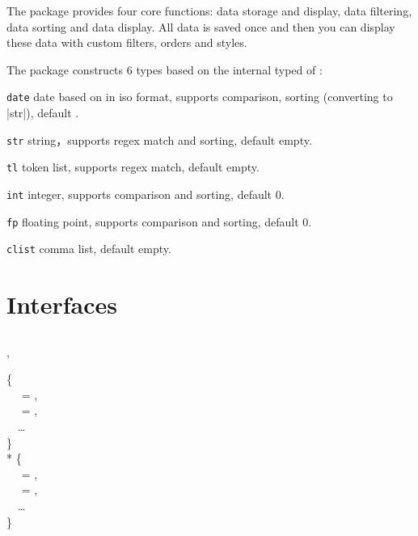 \documentclass[full]{l3doc}
\begin{document}
\begin{documentation}
The package provides four core functions: data storage and display, data
filtering, data sorting and data display. All data is saved once and then you
can display these data with custom filters, orders and styles.

The package constructs 6 types based on the internal typed of :
\begin{Description}
  \item[\texttt{date}]
    date based on  in iso format, supports comparison,
    sorting (converting to |str|), default .
  \item[\texttt{str}]
    string，supports regex match and sorting, default empty.
  \item[\texttt{tl}]
    token list, supports regex match, default empty.
  \item[\texttt{int}]
    integer, supports comparison and sorting, default 0.
  \item[\texttt{fp}]
    floating point, supports comparison and sorting, default 0.
  \item[\texttt{clist}]
    comma list, default empty.
\end{Description}

\section{Interfaces}

\subsection{}

\begin{function}{\dbNewDatabase, \dbNewDatabase*}
  \begin{syntax}
       \{ \\
    ~~ = , \\
    ~~ = , \\
    ~~\ldots{} \\
    \} \\
    *  \{ \\
    ~~ = , \\
    ~~ = , \\
    ~~\ldots{} \\
    \} \\
  \end{syntax}


\end{function}
\end{documentation}
\end{document}
